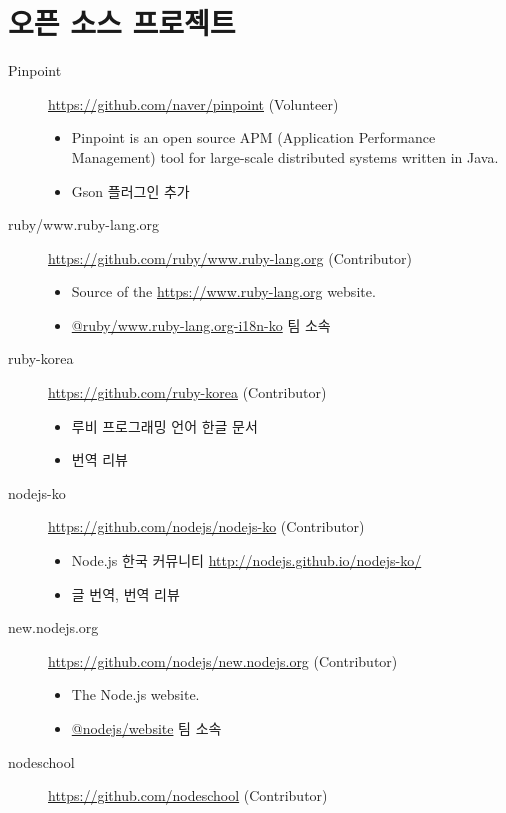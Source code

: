 \documentclass[a4paper,10pt]{article}
\begin{document}
\section{오픈 소스 프로젝트}
\begin{description}
  \item[Pinpoint] \url{https://github.com/naver/pinpoint} (Volunteer)
    \begin{itemize}
      \item Pinpoint is an open source APM (Application Performance Management) tool for large-scale distributed systems written in Java.
      \item Gson 플러그인 추가
    \end{itemize}
  \item[ruby/www.ruby-lang.org] \url{https://github.com/ruby/www.ruby-lang.org} (Contributor)
    \begin{itemize}
      \item Source of the \url{https://www.ruby-lang.org} website.
      \item \href{https://github.com/orgs/ruby/teams/www-ruby-lang-org-i18n-ko}{@ruby/www.ruby-lang.org-i18n-ko} 팀 소속
    \end{itemize}
  \item[ruby-korea] \url{https://github.com/ruby-korea} (Contributor)
    \begin{itemize}
      \item 루비 프로그래밍 언어 한글 문서
      \item 번역 리뷰
    \end{itemize}
  \item[nodejs-ko] \url{https://github.com/nodejs/nodejs-ko} (Contributor)
    \begin{itemize}
      \item Node.js 한국 커뮤니티 \url{http://nodejs.github.io/nodejs-ko/}
      \item 글 번역, 번역 리뷰
    \end{itemize}
  \item[new.nodejs.org] \url{https://github.com/nodejs/new.nodejs.org} (Contributor)
    \begin{itemize}
      \item The Node.js website.
      \item \href{https://github.com/orgs/nodejs/teams/website}{@nodejs/website} 팀 소속
    \end{itemize}
  \item[nodeschool] \url{https://github.com/nodeschool} (Contributor)
    \begin{itemize}

\end{itemize}
\end{description}
\end{document}
